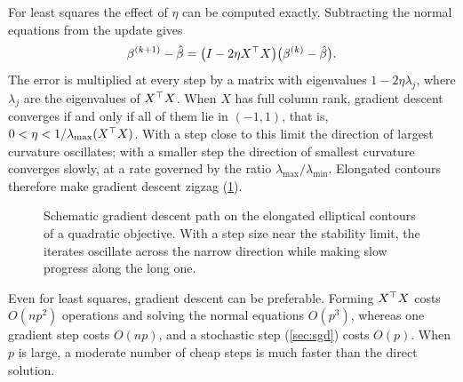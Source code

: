 \begin{remark}\label{rem:gd-quadratic}
For least squares the effect of $\eta$ can be computed exactly. Subtracting the normal equations from the update gives
\[
\beta^{(k+1)}-\hat\beta=\big(I-2\eta X^{\top} X\big)\big(\beta^{(k)}-\hat\beta\big).
\]
The error is multiplied at every step by a matrix with eigenvalues $1-2\eta\lambda_j$, where $\lambda_j$ are the eigenvalues of $X^{\top} X$. When $X$ has full column rank, gradient descent converges if and only if all of them lie in $(-1,1)$, that is, $0<\eta<1/\lambda_{\max}(X^{\top} X)$. With a step close to this limit the direction of largest curvature oscillates; with a smaller step the direction of smallest curvature converges slowly, at a rate governed by the ratio $\lambda_{\max}/\lambda_{\min}$. Elongated contours therefore make gradient descent zigzag (\cref{fig:gd-zigzag}).
\end{remark}

\begin{figure}[ht]
\centering
{}
\caption{Schematic gradient descent path on the elongated elliptical contours of a quadratic objective. With a step size near the stability limit, the iterates oscillate across the narrow direction while making slow progress along the long one.}
\label{fig:gd-zigzag}
\end{figure}

\begin{remark}
Even for least squares, gradient descent can be preferable. Forming $X^{\top} X$ costs $O(np^2)$ operations and solving the normal equations $O(p^3)$, whereas one gradient step costs $O(np)$, and a stochastic step (\cref{sec:sgd}) costs $O(p)$. When $p$ is large, a moderate number of cheap steps is much faster than the direct solution.
\end{remark}

